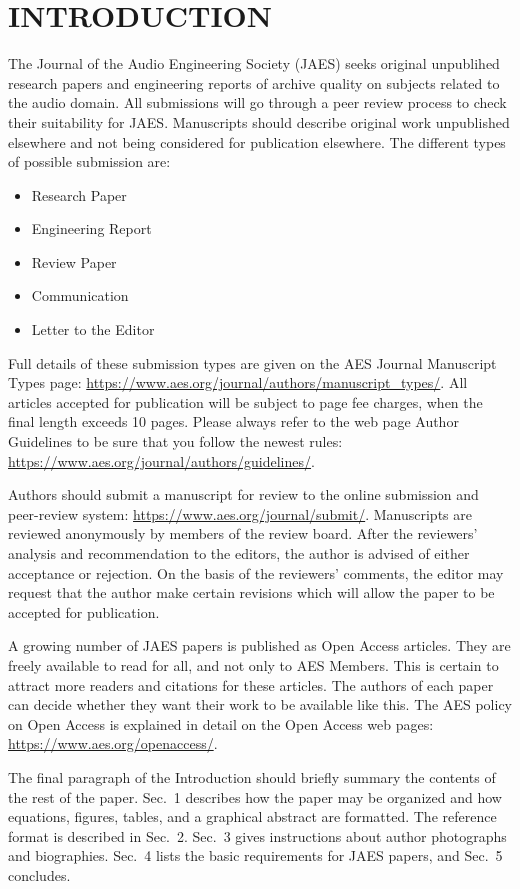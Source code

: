 \documentclass[fleqn]{jaes}
\begin{document}
\section{INTRODUCTION}
The Journal of the Audio Engineering Society (JAES) seeks original unpublihed research papers and engineering reports of archive quality on subjects related to the audio domain. All submissions will go through a peer review process to check their suitability for JAES. Manuscripts should describe original work unpublished elsewhere and not being considered for publication elsewhere. The different types of possible submission are:
\begin{itemize}
    \item Research Paper
    \item Engineering Report
    \item Review Paper
    \item Communication
    \item Letter to the Editor
\end{itemize}
\noindent Full details of these submission types are given on the AES Journal Manuscript Types page: \url{https://www.aes.org/journal/authors/manuscript\_types/}. All articles accepted for publication will be subject to page fee charges, when the final length exceeds 10 pages. Please always refer to the web page Author Guidelines to be sure that you follow the newest rules: \url{https://www.aes.org/journal/authors/guidelines/}.

Authors should submit a manuscript for review to the online submission and peer-review system: \url{https://www.aes.org/journal/submit/}. Manuscripts are reviewed anonymously by members of the review board. After the reviewers’ analysis and recommendation to the editors, the author is advised of either acceptance or rejection. On the basis of the reviewers’ comments, the editor may request that the author make certain revisions which will allow the paper to be accepted for publication.

A growing number of JAES papers is published as Open Access articles. They are freely available to read for all, and not only to AES Members. This is certain to attract more readers and citations for these articles. The authors of each paper can decide whether they want their work to be available like this. The AES policy on Open Access is explained in detail on the Open Access web pages: \url{https://www.aes.org/openaccess/}.

The final paragraph of the Introduction should briefly summary the contents of the rest of the paper. Sec.~1 describes how the paper may be organized and how equations, figures, tables, and a graphical abstract are formatted. The reference format is described in Sec.~2. Sec.~3 gives instructions about author photographs and biographies. Sec.~4 lists the basic requirements for JAES papers, and Sec.~5 concludes. 
\end{document}
